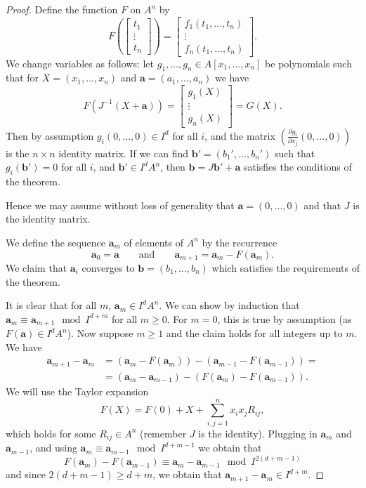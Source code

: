 \documentclass[10pt,a4paper]{amsart}
\begin{document}
	\begin{proof}
		Define the function $F$ on $A^n$ by
		\[F\left(\left[\begin{array}{c}
			t_1\\
			\vdots\\
			t_n
		\end{array}\right]\right) = \left[\begin{array}{c}
			f_1(t_1, \ldots, t_n)\\
			\vdots\\
			f_n(t_1, \ldots, t_n)
		\end{array}\right].\]
		We change variables as follows: let $g_1, \ldots, g_n\in A[x_1, \ldots, x_n]$ be polynomials such that for $X = (x_1, \ldots, x_n)$ and $\mathbf{a} = (a_1, \ldots, a_n)$ we have
		\[F(J^{-1}(X + \mathbf{a})) = \left[\begin{array}{c}
			g_1(X)\\
			\vdots\\
			g_n(X)
		\end{array}\right] = G(X).\]
		Then by assumption $g_i(0, \ldots, 0) \in I^d$ for all $i$, and the matrix $(\frac{\partial g_i}{\partial x_j}(0, \ldots, 0))$ is the $n\times n$ identity matrix. If we can find $\mathbf{b}' = (b_1', \ldots, b_n')$ such that $g_i(\mathbf{b}') = 0$ for all $i$, and $\mathbf{b}'\in I^dA^n$, then $\mathbf{b} = J\mathbf{b}' + \mathbf{a}$ satisfies the conditions of the theorem. 
		
		Hence we may assume without loss of generality that $\mathbf{a} = (0, \ldots, 0)$ and that $J$ is the identity matrix.
		
		We define the sequence $\mathbf{a}_m$ of elements of $A^n$ by the recurrence
		\[\mathbf{a}_0 = \mathbf{a}\qquad\text{and}\qquad \mathbf{a}_{m+1} = \mathbf{a}_m - F(\mathbf{a}_m).\]
		We claim that $\mathbf{a}_i$ converges to $\mathbf{b} = (b_1, \ldots, b_n)$ which satisfies the requirements of the theorem.
		
		It is clear that for all $m$, $\mathbf{a}_m \in I^dA^n$. We can show by induction that $\mathbf{a}_m \equiv \mathbf{a}_{m+1}\mod I^{d+m}$ for all $m\ge 0$. For $m=0$, this is true by assumption (as $F(\mathbf{a})\in I^dA^n$). Now suppose $m\ge 1$ and the claim holds for all integers up to $m$. We have
		\begin{align*}
			\mathbf{a}_{m+1}-\mathbf{a}_m &= (\mathbf{a}_m - F(\mathbf{a}_m)) - (\mathbf{a}_{m-1} - F(\mathbf{a}_{m-1})) =\\
			&= (\mathbf{a}_m - \mathbf{a}_{m-1}) - (F(\mathbf{a}_m) - F(\mathbf{a}_{m-1})).
		\end{align*}	
		We will use the Taylor expansion
		\[F(X) = F(0) + X + \sum_{i,j=1}^n x_ix_jR_{ij},\]
		which holds for some $R_{ij}\in A^n$ (remember $J$ is the identity). Plugging in $\mathbf{a}_m$ and $\mathbf{a}_{m-1}$, and using $\mathbf{a}_{m}\equiv \mathbf{a}_{m-1} \mod I^{d+m-1}$ we obtain that
		\[F(\mathbf{a}_m)-F(\mathbf{a}_{m-1}) \equiv \mathbf{a}_m - \mathbf{a}_{m-1} \mod I^{2(d+m-1)}\]
		and since $2(d+m-1)\ge d + m$, we obtain that $\mathbf{a}_{m+1}-\mathbf{a}_m \in I^{d+m}$.
		

\end{proof}
\end{document}
